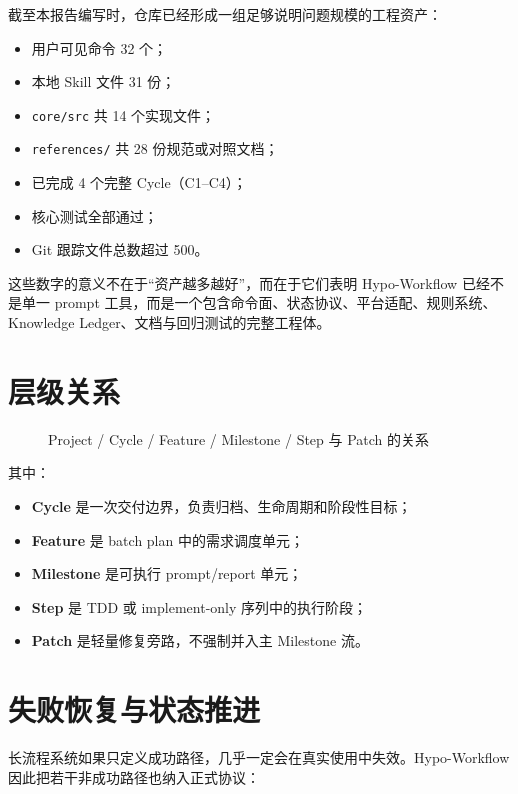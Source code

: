 \documentclass[
  outputdir=build,
  chapterstyle=cn,
  colorscheme=Simple,
  fontset=tech,
  code=false
]{Hypo-Note}
\begin{document}
截至本报告编写时，仓库已经形成一组足够说明问题规模的工程资产：

\begin{itemize}[leftmargin=2em]
  \item 用户可见命令 32 个；
  \item 本地 Skill 文件 31 份；
  \item \texttt{core/src} 共 14 个实现文件；
  \item \texttt{references/} 共 28 份规范或对照文档；
  \item 已完成 4 个完整 Cycle（C1–C4）；
  \item 核心测试全部通过；
  \item Git 跟踪文件总数超过 500。
\end{itemize}

这些数字的意义不在于“资产越多越好”，而在于它们表明 Hypo-Workflow 已经不是单一 prompt 工具，而是一个包含命令面、状态协议、平台适配、规则系统、Knowledge Ledger、文档与回归测试的完整工程体。

\section{层级关系}

\begin{figure}[H]
  \centering
  
  \caption{Project / Cycle / Feature / Milestone / Step 与 Patch 的关系}
\end{figure}

其中：

\begin{itemize}[leftmargin=2em]
  \item \textbf{Cycle} 是一次交付边界，负责归档、生命周期和阶段性目标；
  \item \textbf{Feature} 是 batch plan 中的需求调度单元；
  \item \textbf{Milestone} 是可执行 prompt/report 单元；
  \item \textbf{Step} 是 TDD 或 implement-only 序列中的执行阶段；
  \item \textbf{Patch} 是轻量修复旁路，不强制并入主 Milestone 流。
\end{itemize}

\section{失败恢复与状态推进}

长流程系统如果只定义成功路径，几乎一定会在真实使用中失效。Hypo-Workflow 因此把若干非成功路径也纳入正式协议：
\end{document}
